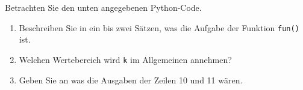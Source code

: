 Betrachten Sie den unten angegebenen Python-Code.
\begin{enumerate}
	\item Beschreiben Sie in ein bis zwei Sätzen, was die Aufgabe der Funktion \verb|fun()| ist.
	\item Welchen Wertebereich wird \verb|k| im Allgemeinen annehmen?
	\item Geben Sie an was die Ausgaben der Zeilen 10 und 11 wären.
\end{enumerate}

